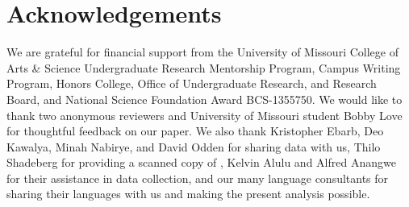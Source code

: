 \documentclass[output=paper]{langscibook}
\begin{document}

\section*{Acknowledgements}

We are grateful for financial support from the University of Missouri College of Arts \& Science Undergraduate Research Mentorship Program, Campus Writing Program, Honors College, Office of Undergraduate Research, and Research Board, and National Science Foundation Award BCS-1355750. We would like to thank two anonymous reviewers and University of Missouri student Bobby Love for thoughtful feedback on our paper. We also thank Kristopher Ebarb, Deo Kawalya, Minah Nabirye, and David Odden for sharing data with us, Thilo Shadeberg for providing a scanned copy of \citet{williams_lexico-statistical_1973}, Kelvin Alulu and Alfred Anangwe for their assistance in data collection, and our many language consultants for sharing their languages with us and making the present analysis possible.

{\sloppy\printbibliography[heading=subbibliography,notkeyword=this]}
\end{document}
